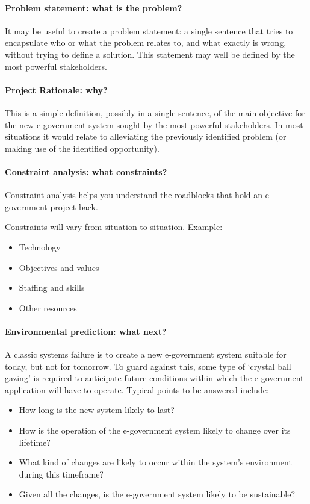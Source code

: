 \paragraph*{Problem statement: what is the problem?}
It may be useful to create a problem statement: a single sentence that tries to encapsulate who or what
the problem relates to, and what exactly is
wrong, without trying to define a solution.
This statement may well be defined by the
most powerful stakeholders.

\paragraph*{Project Rationale: why?}
This is a simple definition, possibly in a
single sentence, of the main objective for
the new e-government system sought by the
most powerful stakeholders. In most situations it would relate to alleviating the previously identified problem (or making use of
the identified opportunity).


\paragraph*{Constraint analysis: what constraints?}
Constraint analysis helps you
understand the roadblocks that hold an
e-government project back.

Constraints will vary from situation to
situation. Example:

\begin{multicols}{2}
	\begin{itemize}
		\item Technology
		\item Objectives and values
		\item Staffing and skills
		\item Other resources
	\end{itemize}
\end{multicols}


\paragraph*{Environmental prediction: what next?}
A classic systems failure is to create a new e-government system suitable for today, but
not for tomorrow. To guard against this,
some type of ‘crystal ball gazing’ is required
to anticipate future conditions within which the e-government application will have
to operate. Typical points to be answered
include:

\begin{itemize}
	\item How long is the new system likely to last?
	\item How is the operation of the e-government system likely to change over its lifetime?
	\item What kind of changes are likely to occur within the system’s environment during this timeframe?
	\item Given all the changes, is the e-government system likely to be sustainable?
\end{itemize}

